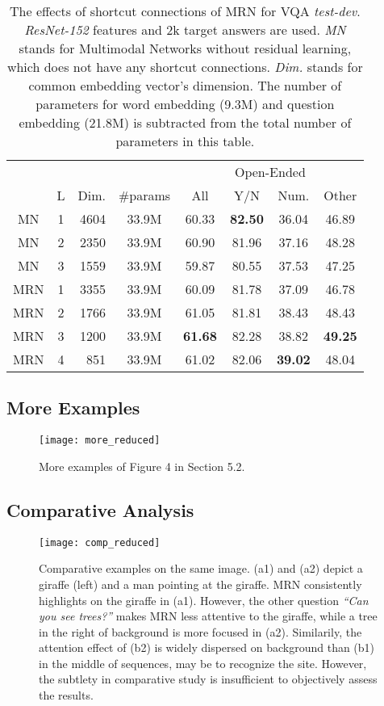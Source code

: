 \documentclass{article}
\begin{document}
\begin{table}[h]
\caption{The effects of shortcut connections of MRN for VQA \textit{test-dev}. \textit{ResNet-152} features and 2k target answers are used. \textit{MN} stands for Multimodal Networks without residual learning, which does not have any shortcut connections. \textit{Dim.} stands for common embedding vector's dimension. The number of parameters for word embedding (9.3M) and question embedding (21.8M) is subtracted from the total number of parameters in this table.}
\label{tab:mn}
\centering
\begin{tabular}{ccrccccc}
\toprule
& & & & \multicolumn{4}{c}{Open-Ended} \\
\cmidrule{5-8}
 & L & Dim. & \#params & All & Y/N & Num. & Other \\
\midrule
MN & 1 & 4604 & 33.9M & 
     60.33 & \textbf{82.50} & 36.04 & 46.89 \\
  MN & 2 & 2350 & 33.9M & 
     60.90 & 81.96 & 37.16 & 48.28 \\
  MN & 3 & 1559 & 33.9M & 
     59.87 & 80.55 & 37.53 & 47.25 \\
\midrule
  MRN & 1 & 3355 & 33.9M & 
     60.09 & 81.78 & 37.09 & 46.78 \\
  MRN & 2 & 1766 & 33.9M & 
     61.05 & 81.81 & 38.43 & 48.43 \\
  MRN & 3 & 1200 & 33.9M & 
     \textbf{61.68} & 82.28 & 38.82 & \textbf{49.25} \\
  MRN & 4 & 851 & 33.9M & 
     61.02 & 82.06 & \textbf{39.02} & 48.04 \\
\bottomrule
\end{tabular}
\end{table}

\newpage
\subsection{More Examples}

\begin{figure}[ht!]
\centering
\texttt{[image: more\_reduced]}
\caption{More examples of Figure 4 in Section 5.2.}
\label{fig:more}
\end{figure} 

\newpage
\subsection{Comparative Analysis}

\begin{figure}[ht!]
\centering
\texttt{[image: comp\_reduced]}
\caption{Comparative examples on the same image. (a1) and (a2) depict a giraffe (left) and a man pointing at the giraffe. MRN consistently highlights on the giraffe in (a1). However, the other question \textit{``Can you see trees?''} makes MRN less attentive to the giraffe, while a tree in the right of background is more focused in (a2). Similarily, the attention effect of (b2) is widely dispersed on background than (b1) in the middle of sequences, may be to recognize the site. However, the subtlety in comparative study is insufficient to objectively assess the results.}
\label{fig:comp}
\end{figure}
\end{document}
